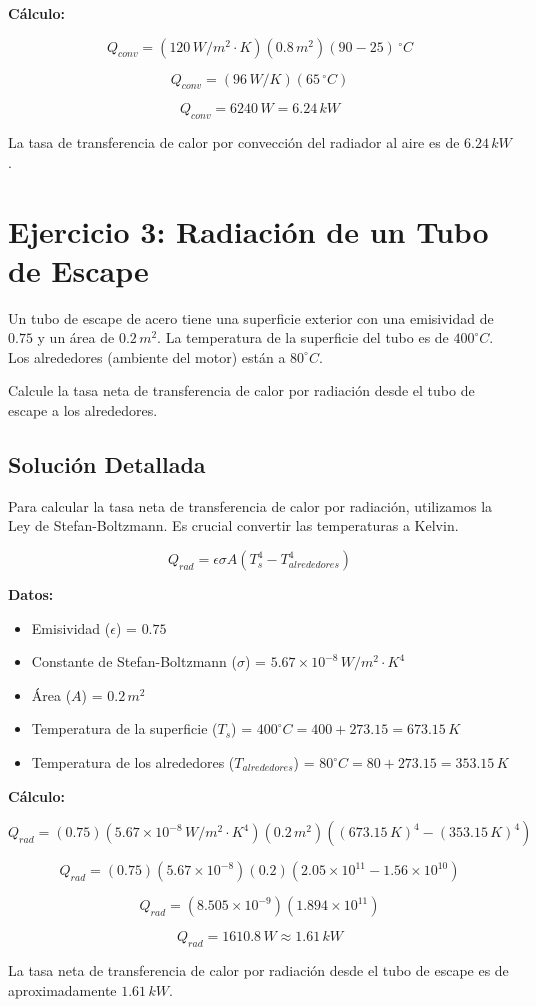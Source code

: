 \documentclass{article}
\begin{document}
\textbf{Cálculo:}

$$ Q_{conv} = (120 \, W/m^2 \cdot K)(0.8 \, m^2)(90 - 25) \, ^\circ C $$

$$ Q_{conv} = (96 \, W/K)(65 \, ^\circ C) $$

$$ Q_{conv} = 6240 \, W = 6.24 \, kW $$

La tasa de transferencia de calor por convección del radiador al aire es de $6.24 \, kW$.

\section*{Ejercicio 3: Radiación de un Tubo de Escape}

Un tubo de escape de acero tiene una superficie exterior con una emisividad de $0.75$ y un área de $0.2 \, m^2$. La temperatura de la superficie del tubo es de $400^\circ C$. Los alrededores (ambiente del motor) están a $80^\circ C$.

Calcule la tasa neta de transferencia de calor por radiación desde el tubo de escape a los alrededores.

\subsection*{Solución Detallada}

Para calcular la tasa neta de transferencia de calor por radiación, utilizamos la Ley de Stefan-Boltzmann. Es crucial convertir las temperaturas a Kelvin.

$$ Q_{rad} = \epsilon \sigma A (T_s^4 - T_{alrededores}^4) $$

\textbf{Datos:}
\begin{itemize}
    \item Emisividad ($\epsilon$) = $0.75$
    \item Constante de Stefan-Boltzmann ($\sigma$) = $5.67 \times 10^{-8} \, W/m^2 \cdot K^4$
    \item Área ($A$) = $0.2 \, m^2$
    \item Temperatura de la superficie ($T_s$) = $400^\circ C = 400 + 273.15 = 673.15 \, K$
    \item Temperatura de los alrededores ($T_{alrededores}$) = $80^\circ C = 80 + 273.15 = 353.15 \, K$
\end{itemize}

\textbf{Cálculo:}

$$ Q_{rad} = (0.75)(5.67 \times 10^{-8} \, W/m^2 \cdot K^4)(0.2 \, m^2) ((673.15 \, K)^4 - (353.15 \, K)^4) $$

$$ Q_{rad} = (0.75)(5.67 \times 10^{-8})(0.2) (2.05 \times 10^{11} - 1.56 \times 10^{10}) $$

$$ Q_{rad} = (8.505 \times 10^{-9}) (1.894 \times 10^{11}) $$

$$ Q_{rad} = 1610.8 \, W \approx 1.61 \, kW $$

La tasa neta de transferencia de calor por radiación desde el tubo de escape es de aproximadamente $1.61 \, kW$.
\end{document}
